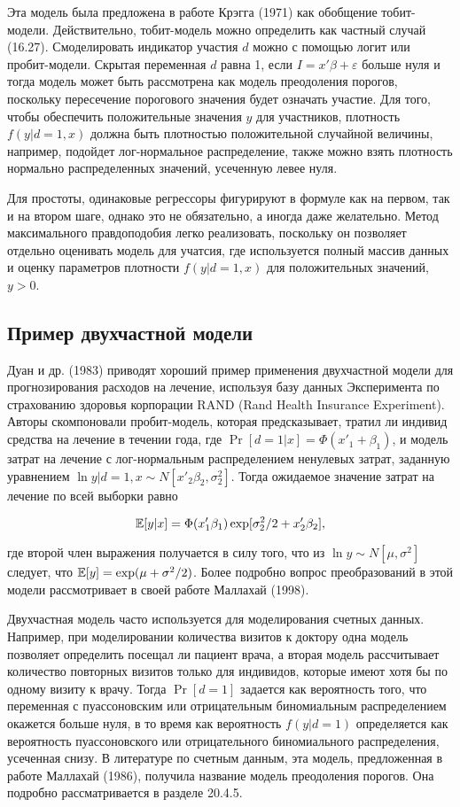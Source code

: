 Эта модель была предложена в работе Крэгга (1971) как обобщение тобит-модели. Действительно, тобит-модель можно определить как частный случай (16.27). Смоделировать индикатор участия $d$ можно с помощью логит или пробит-модели. Скрытая переменная $d$ равна 1, если $I=x'\beta+\varepsilon$ больше нуля и тогда модель может быть рассмотрена как модель преодоления порогов, поскольку пересечение порогового значения будет означать участие. Для того, чтобы обеспечить положительные значения $y$ для участников, плотность $f(y|d=1,x)$ должна быть плотностью положительной случайной величины, например, подойдет лог-нормальное распределение, также можно взять плотность нормально распределенных значений, усеченную левее нуля.

Для простоты, одинаковые регрессоры фигурируют в формуле как на первом, так и на втором шаге, однако это  не обязательно, а иногда даже желательно. Метод максимального правдоподобия легко реализовать, поскольку он позволяет отдельно оценивать модель для учатсия, где используется полный массив данных и оценку параметров плотности $f(y|d=1,x)$ для положительных значений, $y>0$.


\subsection{Пример двухчастной модели}


Дуан и др. (1983) приводят хороший пример применения двухчастной модели для прогнозирования расходов на лечение, используя базу данных Эксперимента по страхованию здоровья корпорации RAND (Rand Health Insurance Experiment). Авторы скомпоновали пробит-модель, которая предсказывает, тратил ли индивид средства на лечение в течении года, где $\Pr[ d=1|x]=\Phi(x'_1+\beta_{1})$, и модель затрат на лечение с лог-нормальным распределением ненулевых затрат, заданную уравнением $\ln{ y|d}=1, x \sim N[x'_2\beta_{2},\sigma^{2}_{2}]$. Тогда ожидаемое значение затрат на лечение по всей выборки равно

\begin{equation}
\mathbb{E}[y|x]=\Phi(x'_1\beta_1)\exp [\sigma^{2}_2/2+x'_2\beta_2],
\end{equation}

где второй член выражения получается в силу того, что из $\ln{ y} \sim N[\mu,\sigma^2]$ следует, что $\mathbb{E}[y]=\exp (\mu+\sigma^{2}/2)$. Более подробно вопрос преобразований в этой модели рассмотривает в своей работе Маллахай (1998).

Двухчастная модель часто используется для моделирования счетных данных. Например, при моделировании количества визитов к доктору одна модель позволяет определить посещал ли пациент врача, а вторая модель рассчитывает количество повторных визитов только для индивидов, которые имеют хотя бы по одному визиту к врачу. Тогда $\Pr[ d=1]$ задается как  вероятность того, что переменная с пуассоновским или отрицательным биномиальным распределением окажется больше нуля, в то время как вероятность $f(y|d=1)$ определяется как вероятность пуассоновского или отрицательного биномиального  распределения, усеченная снизу. В литературе по счетным данным, эта модель, предложенная в работе Маллахай (1986), получила название модель преодоления порогов. Она подробно рассматривается в разделе 20.4.5. 

